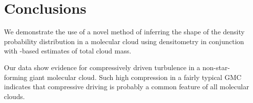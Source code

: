
\section{Conclusions}
We demonstrate the use of a novel method of inferring the shape of the density
probability distribution in a molecular cloud using \formaldehyde densitometry
in conjunction with \thirteenco-based estimates of total cloud mass.

Our data show evidence for compressively driven turbulence in a
non-star-forming giant molecular cloud.  Such high compression in a fairly
typical GMC indicates that compressive driving is probably a common feature of
all molecular clouds.

